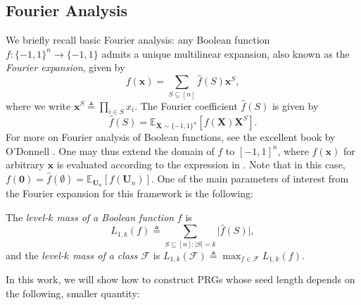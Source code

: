 \subsection{Fourier Analysis} \label{subsec:fourier}
We briefly recall basic Fourier analysis: any Boolean function $f:\{-1,1\}^n \to \{-1,1\}$ admits a unique multilinear expansion, also known as the \emph{Fourier expansion}, given by 
\begin{equation}
\label{eq:fourierexpansion}
    f(\mathbf{x})=\sum_{S\subseteq [n]} \hat{f}(S)\mathbf{x}^S,
\end{equation}
where we write $\mathbf{x}^S\triangleq \prod_{i\in S} x_i$. The   Fourier coefficient $\hat{f}(S)$ is given by
\begin{equation*}
    \hat{f}(S)=\mathbb{E}_{\mathbf{X}\sim \{-1,1\}^n}[f(\mathbf{X})\mathbf{X}^S].
\end{equation*}
For more on Fourier analysis of Boolean functions, see the excellent book by O'Donnell \cite{ODonnelBook}. One may thus extend the domain of $f$ to $[-1,1]^n$, where $f(\mathbf{x})$ for arbitrary $\mathbf{x}$ is evaluated according to the expression in . Note that in this case, $f(\mathbf{0})=\hat{f}(\emptyset)=\mathbb{E}_{\mathbf{U}_n}[f(\mathbf{U}_n)]$. One of the main parameters of interest from the Fourier expansion for this framework is the following:


\begin{definition}
The \emph{level-$k$ mass of a Boolean function} $f$ is 
\begin{equation*}
    L_{1,k}(f)\triangleq \sum_{S\subseteq [n]:\vert S\vert=k} \vert \hat{f}(S)\vert,
\end{equation*}
and the \emph{level-$k$ mass of a class $\mathcal{F}$} is
$L_{1,k}(\mathcal{F})\triangleq \max_{f\in \mathcal{F}} L_{1,k}(f)$.
\end{definition}

In this work, we will show how to construct PRGs whose seed length depends on the following, smaller quantity:

